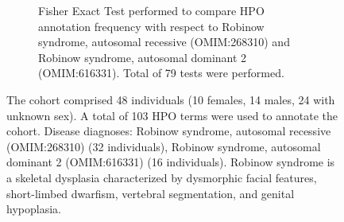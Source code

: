 \begin{figure}[htbp]
\centering
\begin{subfigure}[b]{0.95\textwidth}
\centering
{}
\captionsetup{justification=raggedright,singlelinecheck=false}
\caption{Fisher Exact Test performed to compare HPO annotation frequency with respect to Robinow syndrome, autosomal recessive (OMIM:268310) and Robinow syndrome, autosomal dominant 2 (OMIM:616331). Total of
        79 tests were performed. }
\end{subfigure}
\vspace{2em}
\caption{The cohort comprised 48 individuals (10 females, 14 males, 24 with unknown sex). A total of 103 HPO terms were used to annotate the cohort. Disease diagnoses: Robinow syndrome, autosomal recessive (OMIM:268310) (32 individuals), Robinow syndrome, autosomal dominant 2 (OMIM:616331) (16 individuals). Robinow syndrome is a skeletal dysplasia characterized by dysmorphic facial features, short-limbed dwarfism, vertebral segmentation, and genital hypoplasia.}
\end{figure}

